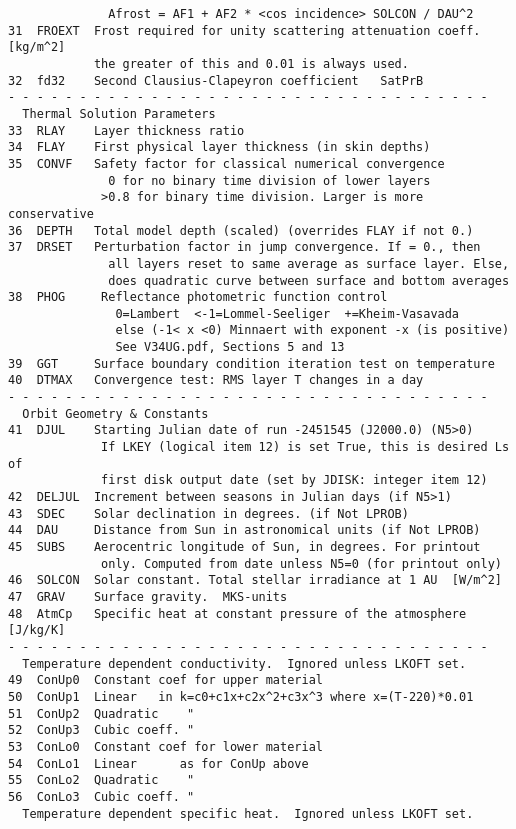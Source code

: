 \documentclass{article}
\begin{document}
\begin{verbatim}
              Afrost = AF1 + AF2 * <cos incidence> SOLCON / DAU^2
31  FROEXT  Frost required for unity scattering attenuation coeff. [kg/m^2]
            the greater of this and 0.01 is always used.
32  fd32    Second Clausius-Clapeyron coefficient   SatPrB
- - - - - - - - - - - - - - - - - - - - - - - - - - - - - - - - - - 
  Thermal Solution Parameters
33  RLAY    Layer thickness ratio
34  FLAY    First physical layer thickness (in skin depths)
35  CONVF   Safety factor for classical numerical convergence
              0 for no binary time division of lower layers
             >0.8 for binary time division. Larger is more conservative
36  DEPTH   Total model depth (scaled) (overrides FLAY if not 0.)
37  DRSET   Perturbation factor in jump convergence. If = 0., then
              all layers reset to same average as surface layer. Else,
              does quadratic curve between surface and bottom averages
38  PHOG     Reflectance photometric function control
               0=Lambert  <-1=Lommel-Seeliger  +=Kheim-Vasavada
               else (-1< x <0) Minnaert with exponent -x (is positive)
               See V34UG.pdf, Sections 5 and 13
39  GGT     Surface boundary condition iteration test on temperature
40  DTMAX   Convergence test: RMS layer T changes in a day
- - - - - - - - - - - - - - - - - - - - - - - - - - - - - - - - - - 
  Orbit Geometry & Constants
41  DJUL    Starting Julian date of run -2451545 (J2000.0) (N5>0)
             If LKEY (logical item 12) is set True, this is desired Ls of 
             first disk output date (set by JDISK: integer item 12)
42  DELJUL  Increment between seasons in Julian days (if N5>1)
43  SDEC    Solar declination in degrees. (if Not LPROB)
44  DAU     Distance from Sun in astronomical units (if Not LPROB)
45  SUBS    Aerocentric longitude of Sun, in degrees. For printout 
             only. Computed from date unless N5=0 (for printout only)
46  SOLCON  Solar constant. Total stellar irradiance at 1 AU  [W/m^2]
47  GRAV    Surface gravity.  MKS-units
48  AtmCp   Specific heat at constant pressure of the atmosphere [J/kg/K]
- - - - - - - - - - - - - - - - - - - - - - - - - - - - - - - - - - 
  Temperature dependent conductivity.  Ignored unless LKOFT set.
49  ConUp0  Constant coef for upper material 
50  ConUp1  Linear   in k=c0+c1x+c2x^2+c3x^3 where x=(T-220)*0.01
51  ConUp2  Quadratic    " 
52  ConUp3  Cubic coeff. "
53  ConLo0  Constant coef for lower material 
54  ConLo1  Linear      as for ConUp above
55  ConLo2  Quadratic    "
56  ConLo3  Cubic coeff. "
  Temperature dependent specific heat.  Ignored unless LKOFT set.

\end{verbatim}
\end{document}
